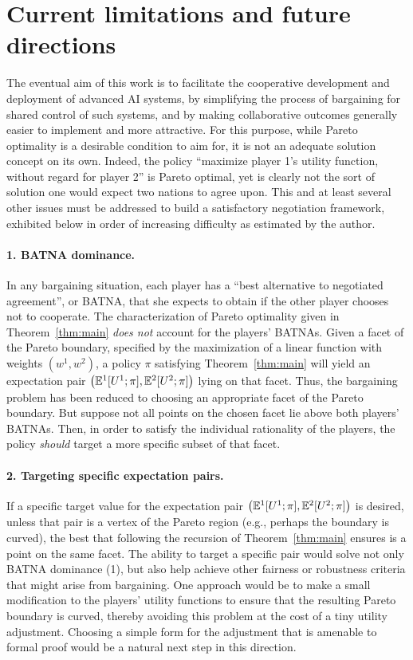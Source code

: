 \documentclass{article}  %
\newcommand{\epair}{\left(\EE^1[U^1;\pi],\EE^2[U^2;\pi]\right)}
\newcommand{\thm}[1]{Theorem~\ref{thm:#1}}
\begin{document}
\section{Current limitations and future directions}

The eventual aim of this work is to facilitate the cooperative development and deployment of advanced AI systems, by simplifying the process of bargaining for shared control of such systems, and by making collaborative outcomes generally easier to implement and more attractive.  For this purpose, while Pareto optimality is a desirable condition to aim for, it is not an adequate solution concept on its own.  Indeed, the policy ``maximize player 1's utility function, without regard for player 2'' is Pareto optimal, yet is clearly not the sort of solution one would expect two nations to agree upon.  This and at least several other issues must be addressed to build a satisfactory negotiation framework, exhibited below in order of increasing difficulty as estimated by the author.

\paragraph{1. BATNA dominance.}  In any bargaining situation, each player has a ``best alternative to negotiated agreement'', or BATNA, that she expects to obtain if the other player chooses not to cooperate.  The characterization of Pareto optimality given in \thm{main} {\em does not} account for the players' BATNAs.  Given a facet of the Pareto boundary, specified by the maximization of a linear function with weights $(w^1,w^2)$, a policy $\pi$ satisfying \thm{main} will yield an expectation pair $\epair$ lying on that facet.  Thus, the bargaining problem has been reduced to choosing an appropriate facet of the Pareto boundary.  But suppose not all points on the chosen facet lie above both players' BATNAs.  Then, in order to satisfy the individual rationality of the players, the policy {\em should} target a more specific subset of that facet.

\paragraph{2. Targeting specific expectation pairs.}  If a specific target value for the expectation pair $\epair$ is desired, unless that pair is a vertex of the Pareto region (e.g., perhaps the boundary is curved), the best that following the recursion of \thm{main} ensures is a point on the same facet.  The ability to target a specific pair would solve not only BATNA dominance (1), but also help achieve other fairness or robustness criteria that might arise from bargaining.  One approach would be to make a small modification to the players' utility functions to ensure that the resulting Pareto boundary is curved, thereby avoiding this problem at the cost of a tiny utility adjustment.  Choosing a simple form for the adjustment that is amenable to formal proof would be a natural next step in this direction.
\end{document}
